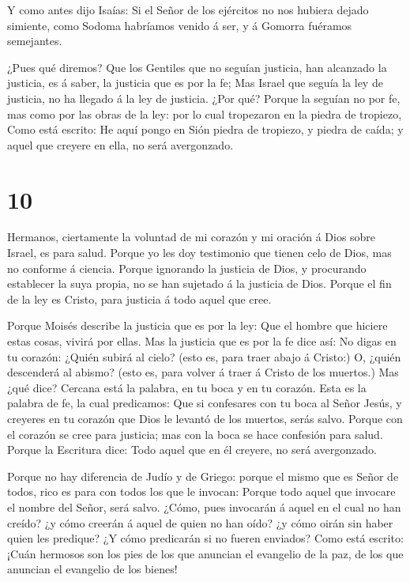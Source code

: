  Y como antes dijo Isaías: Si el Señor de los ejércitos no
nos hubiera dejado simiente, como Sodoma habríamos venido á ser, y á
Gomorra fuéramos semejantes.

 ¿Pues qué diremos? Que los Gentiles que no seguían
justicia, han alcanzado la justicia, es á saber, la justicia que es por
la fe;  Mas Israel que seguía la ley de justicia, no ha
llegado á la ley de justicia.  ¿Por qué? Porque la seguían
no por fe, mas como por las obras de la ley: por lo cual tropezaron en
la piedra de tropiezo,  Como está escrito: He aquí pongo en
Sión piedra de tropiezo, y piedra de caída; y aquel que creyere en ella,
no será avergonzado.

\hypertarget{section-9}{%
\section{10}\label{section-9}}

 Hermanos, ciertamente la voluntad de mi corazón y mi
oración á Dios sobre Israel, es para salud.  Porque yo les
doy testimonio que tienen celo de Dios, mas no conforme á ciencia.
 Porque ignorando la justicia de Dios, y procurando
establecer la suya propia, no se han sujetado á la justicia de Dios.
 Porque el fin de la ley es Cristo, para justicia á todo
aquel que cree.

 Porque Moisés describe la justicia que es por la ley: Que
el hombre que hiciere estas cosas, vivirá por ellas.  Mas la
justicia que es por la fe dice así: No digas en tu corazón: ¿Quién
subirá al cielo? (esto es, para traer abajo á Cristo:)  O,
¿quién descenderá al abismo? (esto es, para volver á traer á Cristo de
los muertos.)  Mas ¿qué dice? Cercana está la palabra, en tu
boca y en tu corazón. Esta es la palabra de fe, la cual predicamos:
 Que si confesares con tu boca al Señor Jesús, y creyeres en
tu corazón que Dios le levantó de los muertos, serás salvo.
 Porque con el corazón se cree para justicia; mas con la
boca se hace confesión para salud.  Porque la Escritura
dice: Todo aquel que en él creyere, no será avergonzado.

 Porque no hay diferencia de Judío y de Griego: porque el
mismo que es Señor de todos, rico es para con todos los que le invocan:
 Porque todo aquel que invocare el nombre del Señor, será
salvo.  ¿Cómo, pues invocarán á aquel en el cual no han
creído? ¿y cómo creerán á aquel de quien no han oído? ¿y cómo oirán sin
haber quien les predique?  ¿Y cómo predicarán si no fueren
enviados? Como está escrito: ¡Cuán hermosos son los pies de los que
anuncian el evangelio de la paz, de los que anuncian el evangelio de los
bienes!

